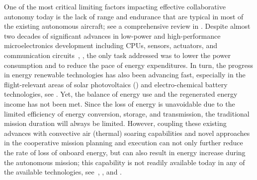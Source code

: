 \documentclass{ifacconf}
\begin{document}
One of the most critical limiting factors impacting effective collaborative
autonomy today is the lack of range and endurance that are typical in most of
the existing autonomous aircraft; see a comprehensive review in
\cite{NAC:2005}.
%
%
Despite almost two decades of significant advances in low-power and
high-performance microelectronics development including CPUs, sensors,
actuators, and communication circuits~\cite{Tong:1995}, \cite{Singh:2010},
the only task addressed was to lower the power consumption and to reduce the
pace of energy expenditures. In turn, the progress in energy renewable
technologies has also been advancing fast, especially in the flight-relevant
areas of solar photovoltaics (\cite{Hamakawa:2004}) and electro-chemical
battery technologies, see \cite{Tarascon:2001}. Yet, the balance of energy
use and the regenerated energy income has not been met. Since the loss of
energy is unavoidable due to the limited efficiency of energy conversion,
storage, and transmission, the traditional mission duration will always be
limited. However, coupling these existing advances with convective air
(thermal) soaring capabilities and novel approaches in the cooperative
mission planning and execution can not only further reduce the rate of loss
of onboard energy, but can also result in energy increase during the
autonomous mission; this capability is not readily available today in any of
the available technologies, see~\cite{Siciliano:2008}, \cite{Martinez:2008},
and \cite{Nonami:2013}.
\end{document}

